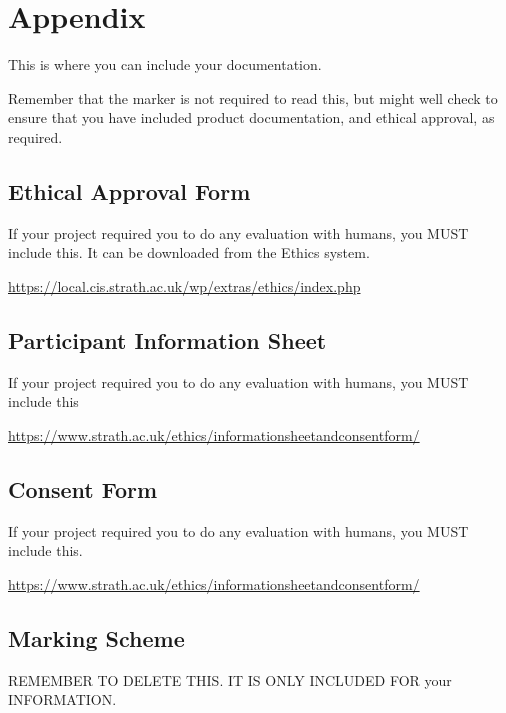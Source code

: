\section{Appendix}

This is where you can include your documentation.

Remember that the marker is not required to read this, but might well check to ensure that you have included product documentation, and ethical approval, as required.

\subsection{Ethical Approval Form}
If your project required you to do any evaluation with humans, you MUST include this. It can be downloaded from the Ethics system.

\url{https://local.cis.strath.ac.uk/wp/extras/ethics/index.php}

\subsection{Participant Information Sheet }
If your project required you to do any evaluation with humans, you MUST include this

\url{https://www.strath.ac.uk/ethics/informationsheetandconsentform/}

\subsection{Consent Form }
If your project required you to do any evaluation with humans, you MUST include this.

\url{https://www.strath.ac.uk/ethics/informationsheetandconsentform/}

\clearpage
\subsection{Marking Scheme}
REMEMBER TO DELETE THIS. IT IS ONLY INCLUDED FOR your INFORMATION.

